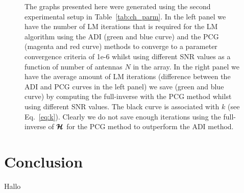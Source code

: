 \documentclass[useAMS,usenatbib]{mn2e}
\newcommand{\bmH}{\bmath{\mathcal{H}}}
\begin{document}
\begin{figure}
\centering
{}
\caption{The graphs presented here were generated using the second experimental setup in Table~\ref{tab:ch_parm}. In the left panel we have the number of LM iterations 
that is required for the LM algorithm using the ADI (green and blue curve) and the PCG (magenta and red curve) methods to converge to a parameter convergence criteria of 1e-6 whilst using different 
SNR values as a function of number of antennas $N$ in the array. In the right panel we have the average amount of LM iterations (difference between the ADI and PCG curves in the left panel) we save (green and blue curve) by computing the full-inverse with the PCG method whilst using different SNR values.
The black curve is associated with $k$ (see Eq.~\eqref{eq:k}). Clearly we do not save enough iterations using the full-inverse of $\bmH$ for the PCG method to outperform the ADI method.
\label{fig:out_diff}} 
\end{figure}

\section{Conclusion}
Hallo
\end{document}
